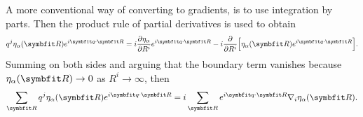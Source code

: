 A more conventional way of converting to gradients, is to use integration by parts. Then the product rule of partial derivatives is used to obtain
\begin{equation}
    \label{eq:Field:Grad:productRuleDerivative}
    q^j\eta_\alpha(\v{R})e^{i\v{q}\cdot\v{R}} = i\frac{\partial\eta_\alpha}{\partial R^i}e^{i\v{q}\cdot\v{R}} - i\frac{\partial}{\partial R^i}\Big[\eta_\alpha(\v{R})e^{i\v{q}\cdot\v{R}}\Big].
\end{equation}
Summing on both sides and arguing that the boundary term vanishes because $\eta_\alpha(\v{R})\to0$ as $R^i\to\infty$, then
\begin{equation}
    \label{eq:Field:Grad:partialIntegraion}
    \sum_\v{R}q^j\eta_\alpha(\v{R})e^{i\v{q}\cdot\v{R}} = i\sum_\v{R}e^{i\v{q}\cdot\v{R}}\nabla_i\eta_\alpha(\v{R}).
\end{equation}
